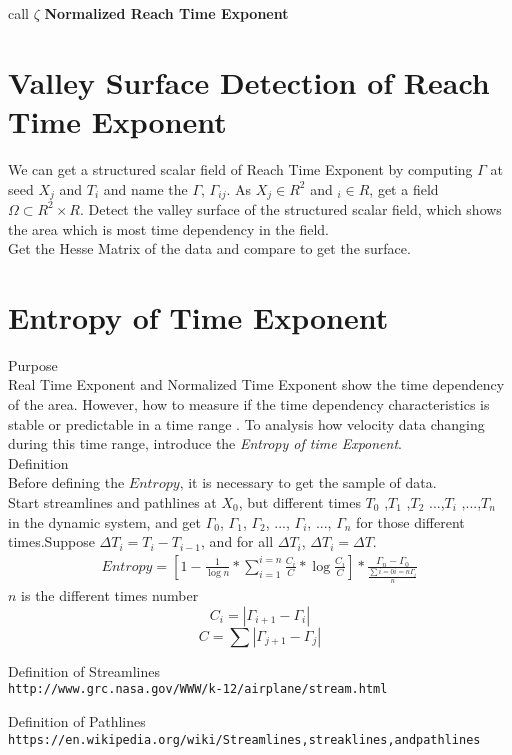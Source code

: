 \documentclass[
     11pt,         %
     a4paper,      %
     oneside,
     ]{article}
\begin{document}
call $\zeta$ \textbf{Normalized Reach Time Exponent}

\section{Valley Surface Detection of Reach Time Exponent}
We can get a structured scalar field of Reach Time Exponent by computing $\Gamma$ at seed $X_{j}$ and $T_{i}$ and name the $\Gamma$, $\Gamma_{ij}$. As $X_{j}\in R^{2}$ and $_{i} \in R$, get a field $\Omega \subset R^{2}\times R$. Detect the valley surface of the structured scalar field, which shows the area which is most time dependency in the field.\\
Get the Hesse Matrix of the data and compare to get the surface.


\section{Entropy of Time Exponent}


 Purpose\\
	Real Time Exponent and Normalized Time Exponent show the time dependency of the area. However, how to measure if the time dependency characteristics is stable or predictable in a time range .
	To analysis how velocity data changing during this time range, introduce the \textit{Entropy of time Exponent}.\\
 Definition\\
	Before defining the $Entropy$, it is necessary to get the sample of data. \\
	Start streamlines and pathlines at $X_{0}$, but different times $T_{0}$ ,$T_{1}$ ,$T_{2}$ ...,$T_{i}$ ,...,$T_{n}$ in the dynamic system, and get $\Gamma_{0}$, $\Gamma_{1}$, $\Gamma_{2}$, ..., $\Gamma_{i}$, ..., $\Gamma_{n}$ for those different times.Suppose $\Delta T_{i}= T_{i}- T_{i-1}$, and for all $\Delta T_{i}$, $\Delta T_{i}=\Delta T$.
	\begin{eqnarray}
	Entropy=[1-\frac{1}{\log n}*\sum_{i=1}^{i=n}\frac{C_{i}}{C}*\log \frac{C_{i}}{C}]*\frac{\Gamma_{n}-\Gamma_{0}}{\frac{\sum{i=0}{i=n} \Gamma_{i}}{n}}
	\end{eqnarray}
	$n$ is the different times number\\
	$$C_{i}=\left|\Gamma_{i+1}-\Gamma_{i}\right|$$
	$$C=\sum\left|\Gamma_{j+1}-\Gamma_{j}\right|$$













\begin{thebibliography}{9}	
	Definition of Streamlines
	\\\texttt{http://www.grc.nasa.gov/WWW/k-12/airplane/stream.html}
	
	Definition of Pathlines
	\\\texttt{https://en.wikipedia.org/wiki/Streamlines,streaklines,andpathlines}
\end{thebibliography}
\end{document}
